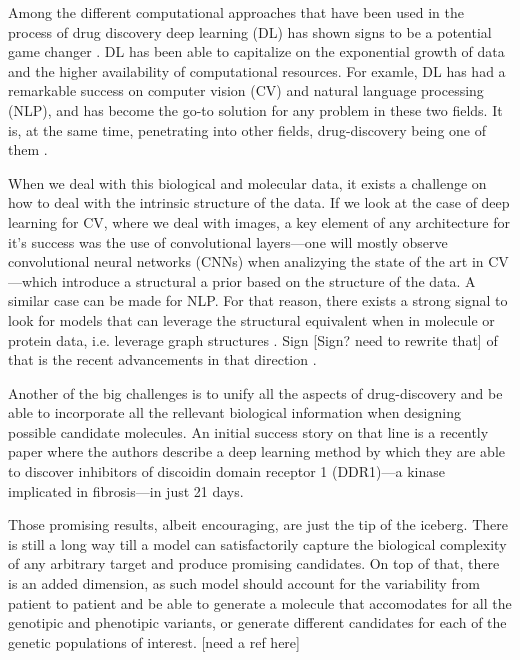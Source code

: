 \documentclass{article}
\begin{document}
Among the different computational approaches that have been used in the process of drug
 discovery deep learning (DL) has shown signs to be a potential game changer
 \cite{Dargan2019}. DL has been able to capitalize on the exponential growth of data and
 the higher availability of computational resources. For examle, DL has had a remarkable
 success on computer vision (CV) and natural language processing (NLP), and has become
 the go-to solution for any problem in these two fields. It is, at the same time,
 penetrating into other fields, drug-discovery being one of them \cite{Chen2018}. 

When we deal with this biological and molecular data, it exists a challenge on how to
 deal with the intrinsic structure of the data.
 If we look at the case of deep learning for CV, where we deal with images, a key
 element of any architecture for it's success was the use of convolutional layers---one
 will mostly observe convolutional neural networks (CNNs) when analizying the state of
 the art in CV---which introduce a structural a prior based on the structure of the
 data. A similar case can be made for NLP. For that reason, there exists a strong signal
 to look for models that can leverage the structural equivalent when in molecule or
 protein data, i.e. leverage graph structures \cite{Wu2019}. Sign [Sign? need to rewrite that] of that
 is the recent advancements in that direction \cite{Sun2019}.
 

Another of the big challenges is to unify all the aspects of drug-discovery and be able
 to incorporate all the rellevant biological information when designing possible
 candidate molecules. An initial success story on that line is a recently paper
 \cite{Zhavoronkov2019} where the authors describe a deep learning method by which they
 are able to discover inhibitors of discoidin domain receptor 1 (DDR1)—a kinase
 implicated in fibrosis—in just 21 days.

Those promising results, albeit encouraging, are just the tip of the iceberg. There is
still a long way till a model can satisfactorily capture the biological complexity of
any arbitrary target and produce promising candidates. On top of that, there is an added
dimension, as such model should account for the variability from patient to patient and
be able to generate a molecule that accomodates for all the genotipic and phenotipic
variants, or generate different candidates for each of the genetic populations of
interest. [need a ref here]
\end{document}
